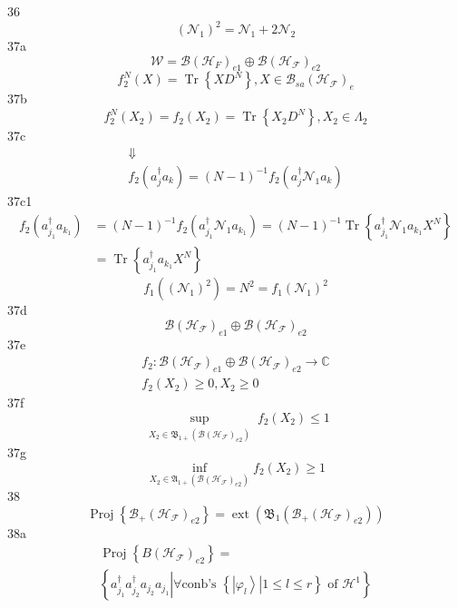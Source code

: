 \documentclass[aps,preprint]{revtex4}%
\begin{document}
36%
\[
\left(  \mathcal{N}_{1}\right)  ^{2}=\mathcal{N}_{1}+2\mathcal{N}_{2}%
\]
37a%
\[
\mathcal{W}=\mathcal{B}\left(  \mathcal{H}_{F}\right)  _{e1}\oplus
\mathcal{B}\left(  \mathcal{H}_{\mathcal{F}}\right)  _{e2}%
\]%
\[
f_{2}^{N}\left(  X\right)  =\operatorname*{Tr}\left\{  XD^{N}\right\}
,X\in\mathcal{B}_{sa}\left(  \mathcal{H}_{\mathcal{F}}\right)  _{e}%
\]
37b%
\[
f_{2}^{N}\left(  X_{2}\right)  =f_{2}\left(  X_{2}\right)  =\operatorname*{Tr}%
\left\{  X_{2}D^{N}\right\}  ,X_{2}\in\Lambda_{2}%
\]
37c%
\begin{gather*}
\Downarrow\\
f_{2}\left(  a_{j}^{\dagger}a_{k}\right)  =\left(  N-1\right)  ^{-1}%
f_{2}\left(  a_{j}^{\dagger}\mathcal{N}_{1}a_{k}\right)
\end{gather*}
37c1%
\begin{align}
f_{2}\left(  a_{j_{1}}^{\dagger}a_{k_{1}}\right)   &  =\left(  N-1\right)
^{-1}f_{2}\left(  a_{j_{1}}^{\dagger}\mathcal{N}_{1}a_{k_{1}}\right)  =\left(
N-1\right)  ^{-1}\operatorname*{Tr}\left\{  a_{j_{1}}^{\dagger}\mathcal{N}%
_{1}a_{k_{1}}X^{N}\right\}  \\
&  =\operatorname*{Tr}\left\{  a_{j_{1}}^{\dagger}a_{k_{1}}X^{N}\right\}
\end{align}%
\[
f_{1}\left(  \left(  \mathcal{N}_{1}\right)  ^{2}\right)  =N^{2}=f_{1}\left(
\mathcal{N}_{1}\right)  ^{2}%
\]
37d%
\[
\mathcal{B}\left(  \mathcal{H}_{\mathcal{F}}\right)  _{e1}\oplus
\mathcal{B}\left(  \mathcal{H}_{\mathcal{F}}\right)  _{e2}%
\]
37e%
\begin{gather*}
f_{2}:\mathcal{B}\left(  \mathcal{H}_{\mathcal{F}}\right)  _{e1}%
\oplus\mathcal{B}\left(  \mathcal{H}_{\mathcal{F}}\right)  _{e2}%
\rightarrow\mathbb{C}\\
f_{2}\left(  X_{2}\right)  \geq0,X_{2}\geq0
\end{gather*}
37f%
\[
\sup_{\substack{X_{2}\in\mathfrak{B}_{1+}\left(  \mathcal{B}\left(
\mathcal{H}_{\mathcal{F}}\right)  _{e2}\right)  }}f_{2}\left(  X_{2}\right)
\leq1
\]
37g%
\[
\inf_{X_{2}\in\mathfrak{A}_{1+}\left(  \mathcal{B}\left(  \mathcal{H}%
_{\mathcal{F}}\right)  _{e2}\right)  }f_{2}\left(  X_{2}\right)  \geq1
\]
38%
\[
\operatorname*{Proj}\left\{  \mathcal{B}_{+}\left(  \mathcal{H}_{\mathcal{F}%
}\right)  _{e2}\right\}  =\operatorname*{ext}\left(  \mathfrak{B}_{1}\left(
\mathcal{B}_{+}\left(  \mathcal{H}_{\mathcal{F}}\right)  _{e2}\right)
\right)
\]
38a%
\begin{gather*}
\operatorname*{Proj}\left\{  B\left(  \mathcal{H}_{\mathcal{F}}\right)
_{e2}\right\}  =\\
\left\{  \left.  a_{j_{1}}^{\dagger}a_{j_{2}}^{\dagger}a_{j_{2}}a_{j_{1}%
}\right\vert \forall\text{conb's }\left\{  \left.  \left\vert \varphi
_{l}\right\rangle \right\vert 1\leq l\leq r\right\}  \text{ of }%
\mathcal{H}^{1}\right\}
\end{gather*}
\end{document}
